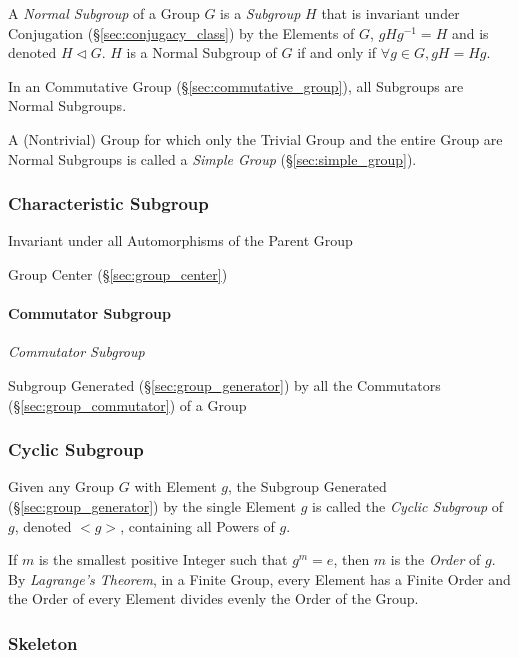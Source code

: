 A \emph{Normal Subgroup} of a Group $G$ is a \emph{Subgroup} $H$ that is
invariant under Conjugation (\S\ref{sec:conjugacy_class}) by the Elements of
$G$, $gHg^{-1} = H$ and is denoted $H \triangleleft G$. $H$ is a Normal Subgroup
of $G$ if and only if $\forall g \in G, gH = Hg$.

In an Commutative Group (\S\ref{sec:commutative_group}), all Subgroups are
Normal Subgroups.

A (Nontrivial) Group for which only the Trivial Group and the entire Group are
Normal Subgroups is called a \emph{Simple Group} (\S\ref{sec:simple_group}).



\subsubsection{Characteristic Subgroup}\label{sec:characteristic_subgroup}

Invariant under all Automorphisms of the Parent Group

Group Center (\S\ref{sec:group_center})



\paragraph{Commutator Subgroup}\label{sec:commutator_subgroup}\hfill

\emph{Commutator Subgroup}

Subgroup Generated (\S\ref{sec:group_generator}) by all the
Commutators (\S\ref{sec:group_commutator}) of a Group



\subsubsection{Cyclic Subgroup}\label{sec:cyclic_subgroup}

Given any Group $G$ with Element $g$, the Subgroup Generated
(\S\ref{sec:group_generator}) by the single Element $g$ is called the
\emph{Cyclic Subgroup} of $g$, denoted $<g>$, containing all Powers of
$g$.

If $m$ is the smallest positive Integer such that $g^m = e$, then $m$
is the \emph{Order} of $g$. By \emph{Lagrange's Theorem}, in a Finite
Group, every Element has a Finite Order and the Order of every Element
divides evenly the Order of the Group.



\subsubsection{Skeleton}\label{sec:group_skeleton}

